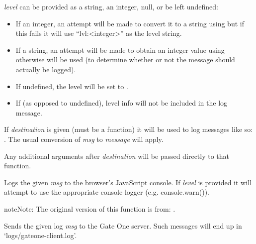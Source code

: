 \documentclass[letterpaper,10pt,openany]{sphinxmanual}
\begin{document}
\begin{fulllineitems}
\begin{fulllineitems}
\begin{fulllineitems}
\emph{level} can be provided as a string, an integer, null, or be left undefined:
\begin{itemize}
\item {} 
If an integer, an attempt will be made to convert it to a string using  but if this fails it will use ``lvl:\textless{}integer\textgreater{}'' as the level string.

\item {} 
If a string, an attempt will be made to obtain an integer value using  otherwise  will be used (to determine whether or not the message should actually be logged).

\item {} 
If undefined, the level will be set to .

\item {} 
If  (as opposed to undefined), level info will not be included in the log message.

\end{itemize}

If \emph{destination} is given (must be a function) it will be used to log messages like so: .  The usual conversion of \emph{msg} to \emph{message} will apply.

Any additional arguments after \emph{destination} will be passed directly to that function.

\end{fulllineitems}



\begin{fulllineitems}
\label{Developer/js_gateone:GateOne.Logging.logToConsole}
Logs the given \emph{msg} to the browser's JavaScript console.  If \emph{level} is provided it will attempt to use the appropriate console logger (e.g. console.warn()).

\begin{notice}{note}{Note:}
The original version of this function is from: .
\end{notice}

\end{fulllineitems}



\begin{fulllineitems}
\label{Developer/js_gateone:GateOne.Logging.logToServer}
Sends the given log \emph{msg} to the Gate One server.  Such messages will end up in `logs/gateone-client.log'.


\end{fulllineitems}
\end{fulllineitems}
\end{fulllineitems}
\end{document}
